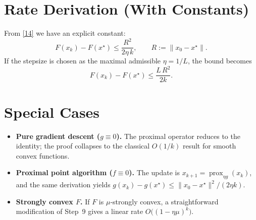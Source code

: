 \documentclass{article}
\newcommand{\prox}{\operatorname{prox}}
\begin{document}
\section*{Rate Derivation (With Constants)}
From \eqref{14} we have an explicit constant:
\[
\boxed{\;
F(x_{k})-F(x^{\star})\le \frac{R^{2}}{2\eta\,k},
\qquad R:=\|x_{0}-x^{\star}\|.
\;}
\]
If the stepsize is chosen as the maximal admissible $\eta=1/L$, the bound becomes
\[
F(x_{k})-F(x^{\star})\le \frac{L\,R^{2}}{2k}.
\]

\section*{Special Cases}
\begin{itemize}
  \item \textbf{Pure gradient descent ($g\equiv0$).} The proximal operator reduces to the identity; the proof collapses to the classical $O(1/k)$ result for smooth convex functions.
  \item \textbf{Proximal point algorithm ($f\equiv0$).} The update is $x_{k+1}=\prox_{\eta g}(x_{k})$, and the same derivation yields $g(x_{k})-g(x^{\star})\le\|x_{0}-x^{\star}\|^{2}/(2\eta k)$.
  \item \textbf{Strongly convex $F$.} If $F$ is $\mu$‑strongly convex, a straightforward modification of Step~9 gives a linear rate $O\bigl((1-\eta\mu)^{k}\bigr)$.
\end{itemize}
\end{document}
